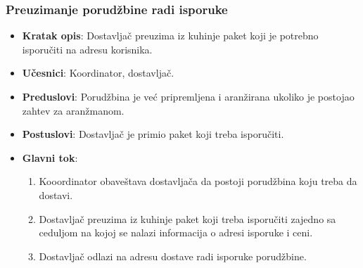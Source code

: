 \subsubsection{Preuzimanje porudžbine radi isporuke}
\begin{itemize}
    \item \textbf{Kratak opis}:
    Dostavljač preuzima iz kuhinje paket koji je potrebno isporučiti na adresu korisnika.
    \item \textbf{Učesnici}: 
    Koordinator, dostavljač.
    \item \textbf{Preduslovi}:
    Porudžbina je već pripremljena i aranžirana ukoliko je postojao zahtev za aranžmanom.
    \item \textbf{Postuslovi}:
    Dostavljač je primio paket koji treba isporučiti.
    \item \textbf{Glavni tok}:
   \begin{enumerate}
        \item Kooordinator obaveštava
        dostavljača da postoji porudžbina koju 
        treba da dostavi.
        \item Dostavljač preuzima iz kuhinje paket koji treba isporučiti zajedno sa ceduljom na kojoj se nalazi informacija o adresi isporuke i ceni.
        \item Dostavljač odlazi na adresu dostave radi isporuke porudžbine.
\end{enumerate}
\end{itemize}


